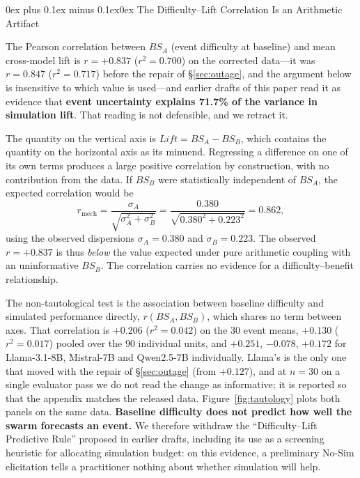 \documentclass[11pt,journal,onecolumn]{IEEEtran}
\makeatletter
\renewcommand\subsubsection{\@startsection{subsubsection}{3}{\parindent}%
  {0ex plus 0.1ex minus 0.1ex}{0ex}%
  {\normalfont\normalsize\bfseries\itshape}}
\makeatother
\begin{document}
\subsubsection{The Difficulty--Lift Correlation Is an Arithmetic Artifact}
\label{sec:tautology}

The Pearson correlation between $BS_A$ (event difficulty at baseline) and mean cross-model lift is $r = +0.837$ ($r^2 = 0.700$) on the corrected data---it was $r = 0.847$ ($r^2 = 0.717$) before the repair of \S\ref{sec:outage}, and the argument below is insensitive to which value is used---and earlier drafts of this paper read it as evidence that \textbf{event uncertainty explains 71.7\% of the variance in simulation lift}. That reading is not defensible, and we retract it.

The quantity on the vertical axis is $Lift = BS_A - BS_B$, which contains the quantity on the horizontal axis as its minuend. Regressing a difference on one of its own terms produces a large positive correlation by construction, with no contribution from the data. If $BS_B$ were statistically independent of $BS_A$, the expected correlation would be
\begin{equation}
    r_{\text{mech}} = \frac{\sigma_A}{\sqrt{\sigma_A^2 + \sigma_B^2}}
      = \frac{0.380}{\sqrt{0.380^2 + 0.223^2}} = 0.862 ,
\end{equation}
using the observed dispersions $\sigma_A = 0.380$ and $\sigma_B = 0.223$. The observed $r = +0.837$ is thus \emph{below} the value expected under pure arithmetic coupling with an uninformative $BS_B$. The correlation carries no evidence for a difficulty--benefit relationship.

The non-tautological test is the association between baseline difficulty and simulated performance directly, $r(BS_A, BS_B)$, which shares no term between axes. That correlation is $\mathbf{+0.206}$ ($r^2 = 0.042$) on the $30$ event means, $+0.130$ ($r^2 = 0.017$) pooled over the $90$ individual units, and $+0.251$, $-0.078$, $+0.172$ for Llama-3.1-8B, Mistral-7B and Qwen2.5-7B individually. Llama's is the only one that moved with the repair of \S\ref{sec:outage} (from $+0.127$), and at $n=30$ on a single evaluator pass we do not read the change as informative; it is reported so that the appendix matches the released data. Figure~\ref{fig:tautology} plots both panels on the same data. \textbf{Baseline difficulty does not predict how well the swarm forecasts an event.} We therefore withdraw the ``Difficulty--Lift Predictive Rule'' proposed in earlier drafts, including its use as a screening heuristic for allocating simulation budget: on this evidence, a preliminary No-Sim elicitation tells a practitioner nothing about whether simulation will help.
\end{document}
